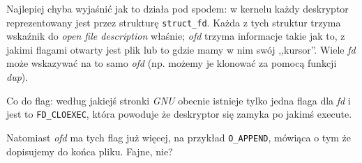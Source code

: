 Najlepiej chyba wyjaśnić jak to działa pod spodem: w kernelu każdy deskryptor reprezentowany jest przez strukturę \texttt{struct\_fd}. Każda z tych struktur trzyma wskaźnik do \textit{open file description} właśnie; \textit{ofd} trzyma informacje takie jak to, z jakimi flagami otwarty jest plik lub to gdzie mamy w nim swój ,,kursor''. Wiele \textit{fd} może wskazywać na to samo \textit{ofd} (np. możemy je klonować za pomocą funkcji \textit{dup}).

Co do flag: według jakiejś stronki \textit{GNU} obecnie istnieje tylko jedna flaga dla \textit{fd} i jest to \texttt{FD\_CLOEXEC}, która powoduje że deskryptor się zamyka po jakimś execute.

Natomiast \textit{ofd} ma tych flag już więcej, na przykład \texttt{O\_APPEND}, mówiąca o tym że dopisujemy do końca pliku. Fajne, nie?